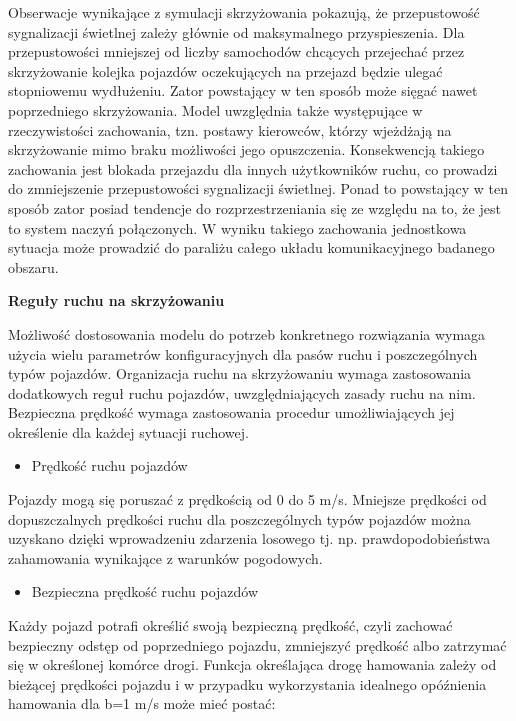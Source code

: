 \documentclass{sprawozdanie-agh}
\begin{document}
		Obserwacje wynikające z symulacji skrzyżowania pokazują, że przepustowość sygnalizacji świetlnej zależy głównie od maksymalnego przyspieszenia. Dla przepustowości mniejszej od liczby samochodów chcących przejechać przez skrzyżowanie kolejka pojazdów oczekujących na przejazd będzie ulegać stopniowemu wydłużeniu. Zator powstający w ten sposób może sięgać nawet poprzedniego skrzyżowania. Model uwzględnia także występujące w rzeczywistości zachowania, tzn. postawy kierowców, którzy wjeżdżają na skrzyżowanie mimo braku możliwości jego opuszczenia. Konsekwencją takiego zachowania jest blokada przejazdu dla innych użytkowników ruchu, co prowadzi do zmniejszenie przepustowości sygnalizacji świetlnej. Ponad to powstający w ten sposób zator posiad tendencje do rozprzestrzeniania się ze względu na to, że jest to system naczyń połączonych. W wyniku takiego zachowania jednostkowa sytuacja może prowadzić do paraliżu całego układu komunikacyjnego badanego obszaru.

		\parskip=10pt
		\textbf {Reguły ruchu na skrzyżowaniu}

		Możliwość dostosowania modelu do potrzeb konkretnego rozwiązania wymaga użycia wielu parametrów konfiguracyjnych dla pasów ruchu i poszczególnych typów pojazdów. Organizacja ruchu na skrzyżowaniu wymaga zastosowania dodatkowych reguł ruchu pojazdów, uwzględniających zasady ruchu na nim. Bezpieczna prędkość wymaga zastosowania procedur umożliwiających jej określenie dla każdej sytuacji ruchowej.

		\begin{itemize}
			\item Prędkość ruchu pojazdów
		\end{itemize}

		Pojazdy mogą się poruszać z prędkością od 0 do 5 m/s. Mniejsze prędkości od dopuszczalnych prędkości ruchu dla poszczególnych typów pojazdów można uzyskano dzięki wprowadzeniu zdarzenia losowego tj. np. prawdopodobieństwa zahamowania wynikające z warunków pogodowych.

		\begin{itemize}
			\item 	Bezpieczna prędkość ruchu pojazdów
		\end{itemize}

		Każdy pojazd potrafi określić swoją bezpieczną prędkość, czyli zachować bezpieczny odstęp od poprzedniego pojazdu, zmniejszyć prędkość albo zatrzymać się w określonej komórce drogi. Funkcja określająca drogę hamowania zależy od bieżącej prędkości pojazdu i w przypadku wykorzystania idealnego opóźnienia hamowania dla b=1 m/s może mieć postać:
\end{document}
